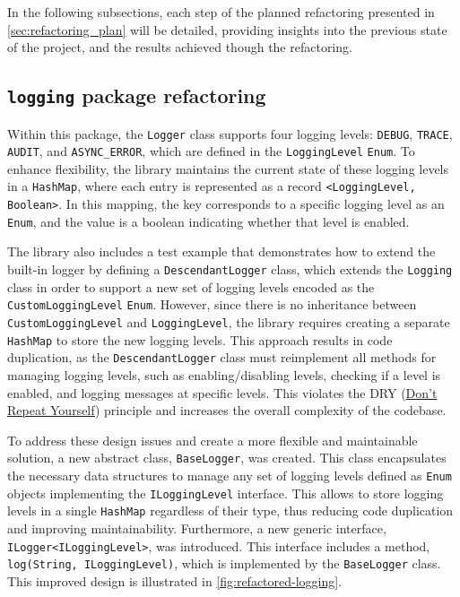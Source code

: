 In the following subsections, each step of the planned refactoring presented in \autoref{sec:refactoring_plan} will be detailed, providing insights into the previous state of the project, and the results achieved though the refactoring.

\subsection{\texttt{logging} package refactoring}

Within this package, the \texttt{Logger} class supports four logging levels: \texttt{DEBUG}, \texttt{TRACE}, \texttt{AUDIT}, and \texttt{ASYNC\_ERROR}, which are defined in the \texttt{LoggingLevel} \texttt{Enum}. To enhance flexibility, the library maintains the current state of these logging levels in a \texttt{HashMap}, where each entry is represented as a record \texttt{<LoggingLevel, Boolean>}. In this mapping, the key corresponds to a specific logging level as an \texttt{Enum}, and the value is a boolean indicating whether that level is enabled.

The library also includes a test example that demonstrates how to extend the built-in logger by defining a \texttt{DescendantLogger} class, which extends the \texttt{Logging} class in order to support a new set of logging levels encoded as the \texttt{CustomLoggingLevel} \texttt{Enum}. However, since there is no inheritance between \texttt{CustomLoggingLevel} and \texttt{LoggingLevel}, the library requires creating a separate \texttt{HashMap} to store the new logging levels. This approach results in code duplication, as the \texttt{DescendantLogger} class must reimplement all methods for managing logging levels, such as enabling/disabling levels, checking if a level is enabled, and logging messages at specific levels. This violates the DRY (\href{https://en.wikipedia.org/wiki/Don%27\_repeat\_yourself}{Don't Repeat Yourself}) principle and increases the overall complexity of the codebase.

To address these design issues and create a more flexible and maintainable solution, a new abstract class, \texttt{BaseLogger}, was created. This class encapsulates the necessary data structures to manage any set of logging levels defined as \texttt{Enum} objects implementing the \texttt{ILoggingLevel} interface. This allows to store logging levels in a single \texttt{HashMap} regardless of their type, thus reducing code duplication and improving maintainability. Furthermore, a new generic interface, \texttt{ILogger<ILoggingLevel>}, was introduced. This interface includes a method, \texttt{log(String, ILoggingLevel)}, which is implemented by the \texttt{BaseLogger} class. This improved design is illustrated in \autoref{fig:refactored-logging}.


